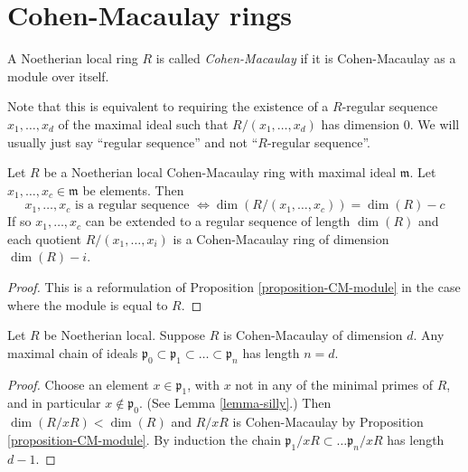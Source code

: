 \section{Cohen-Macaulay rings}
\label{section-CM-ring}

\begin{definition}
\label{definition-local-ring-CM}
A Noetherian local ring $R$ is called {\it Cohen-Macaulay}
if it is Cohen-Macaulay as a module over itself.
\end{definition}

\noindent
Note that this is equivalent to requiring the existence
of a $R$-regular sequence $x_1, \ldots, x_d$ of the maximal
ideal such that $R/(x_1, \ldots, x_d)$ has dimension $0$.
We will usually just say ``regular sequence'' and not
``$R$-regular sequence''.

\begin{lemma}
\label{lemma-reformulate-CM}
Let $R$ be a Noetherian local Cohen-Macaulay ring with maximal
ideal $\mathfrak m $. Let $x_1, \ldots, x_c \in \mathfrak m$ be
elements. Then
$$
x_1, \ldots, x_c
\text{ is a regular sequence }
\Leftrightarrow
\dim(R/(x_1, \ldots, x_c)) = \dim(R) - c
$$
If so
$x_1, \ldots, x_c$ can be extended to
a regular sequence of length $\dim(R)$ and each quotient
$R/(x_1, \ldots, x_i)$ is a Cohen-Macaulay ring of dimension
$\dim(R) - i$.
\end{lemma}

\begin{proof}
This is a reformulation of Proposition \ref{proposition-CM-module}
in the case where the module is equal to $R$.
\end{proof}

\begin{lemma}
\label{lemma-maximal-chain-CM}
Let $R$ be Noetherian local.
Suppose $R$ is Cohen-Macaulay of dimension $d$.
Any maximal chain of ideals $\mathfrak p_0 \subset
\mathfrak p_1 \subset \ldots \subset \mathfrak p_n$
has length $n = d$.
\end{lemma}

\begin{proof}
Choose an element $x \in \mathfrak p_1$, with $x$ not in
any of the minimal primes of $R$, and in particular
$x \not \in \mathfrak p_0$. (See Lemma \ref{lemma-silly}.)
Then $\dim (R/xR) < \dim (R)$ and $R/xR$ is Cohen-Macaulay
by Proposition \ref{proposition-CM-module}. By induction
the chain $\mathfrak p_1/xR \subset \ldots \mathfrak p_n/xR$
has length $d - 1$.
\end{proof}

